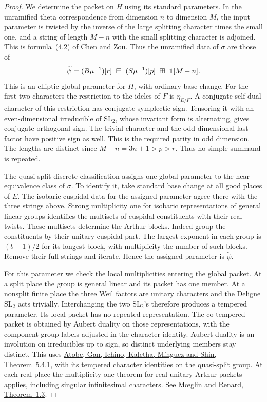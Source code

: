 \documentclass[a4paper,11pt]{article}
\theoremstyle{definition}
\theoremstyle{remark}
\numberwithin{equation}{section}
\begin{document}
\begin{proof}
We determine the packet on \(H\) using its standard parameters.
In the unramified theta correspondence from dimension \(n\) to
dimension \(M\), the input parameter is twisted by the inverse
of the large splitting character times the small one, and a
string of length \(M-n\) with the small splitting character is
adjoined. This is formula~(4.2) of
\href{https://arxiv.org/pdf/2103.07956}{Chen and Zou}.
Thus the unramified data of \(\sigma\) are those of
\[
 \widetilde\psi=(B\mu^{-1})[r]\ \boxplus\
                 (S\mu^{-1})[p]\ \boxplus\ {\bf1}[M-n].
\]
This is an elliptic global parameter for \(H\), with ordinary
base change. For the first two characters the restriction to the
ideles of \(F\) is \(\eta_{E/F}\). A conjugate self-dual character
of this restriction has conjugate-symplectic sign. Tensoring it
with an even-dimensional irreducible of \(\mathrm{SL}_2\), whose
invariant form is alternating, gives conjugate-orthogonal sign.
The trivial character and the odd-dimensional last factor have
positive sign as well. This is the required parity in odd dimension.
The lengths are distinct since \(M-n=3n+1>p>r\). Thus no simple
summand is repeated.

The quasi-split discrete classification assigns one global parameter
to the near-equivalence class of \(\sigma\). To identify it, take
standard base change at all good places of \(E\). The isobaric
cuspidal data for the assigned parameter agree there with the
three strings above. Strong multiplicity one for isobaric
representations of general linear groups identifies the multisets of
cuspidal constituents with their real twists. These multisets
determine the Arthur blocks. Indeed group the constituents by
their unitary cuspidal part. The largest exponent in each group
is \((b-1)/2\) for its longest block, with multiplicity the number
of such blocks. Remove their full strings and iterate. Hence the
assigned parameter is \(\widetilde\psi\).

For this parameter we check the local multiplicities entering the
global packet. At a split place the group is general linear and
its packet has one member. At a nonsplit finite place the three
Weil factors are unitary characters and the Deligne
\(\mathrm{SL}_2\) acts trivially. Interchanging the two
\(\mathrm{SL}_2\)'s therefore produces a tempered parameter.
Its local packet has no repeated representation. The co-tempered
packet is obtained by Aubert duality on those representations,
with the component-group labels adjusted in the character identity.
Aubert duality is an involution on irreducibles up to sign, so
distinct underlying members stay distinct. This uses
\href{https://arxiv.org/pdf/2410.13504}
{Atobe, Gan, Ichino, Kaletha, M\'inguez and Shin, Theorem~5.4.1},
with its tempered character identities on the quasi-split group.
At each real place the multiplicity-one theorem for real unitary
Arthur packets applies, including singular infinitesimal characters.
See \href{https://webusers.imj-prg.fr/~colette.moeglin/MR7.pdf}
{M{\oe}glin and Renard, Theorem~1.3}.


\end{proof}
\end{document}
